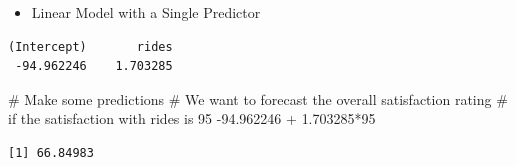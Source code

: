 \documentclass[
  ignorenonframetext,
]{beamer}
\newenvironment{Shaded}{\begin{snugshade}}{\end{snugshade}}
\newcommand{\CommentTok}[1]{\textcolor[rgb]{0.37,0.37,0.37}{#1}}
\newcommand{\DecValTok}[1]{\textcolor[rgb]{0.68,0.00,0.00}{#1}}
\newcommand{\FloatTok}[1]{\textcolor[rgb]{0.68,0.00,0.00}{#1}}
\newcommand{\NormalTok}[1]{\textcolor[rgb]{0.00,0.23,0.31}{#1}}
\newcommand{\SpecialCharTok}[1]{\textcolor[rgb]{0.37,0.37,0.37}{#1}}
\providecommand{\tightlist}{%
  \setlength{\itemsep}{0pt}\setlength{\parskip}{0pt}}\usepackage{longtable,booktabs,array}
\begin{document}
\begin{frame}[fragile]{}
\label{section-14}
\begin{itemize}
\tightlist
\item
  Linear Model with a Single Predictor
\end{itemize}

\tiny

\begin{Shaded}
\end{Shaded}

\begin{verbatim}
(Intercept)       rides 
 -94.962246    1.703285 
\end{verbatim}

\begin{Shaded}
\begin{Highlighting}[]
\CommentTok{\# Make some predictions}
\CommentTok{\# We want to forecast the overall satisfaction rating}
\CommentTok{\# if the satisfaction with rides is 95}
\SpecialCharTok{{-}}\FloatTok{94.962246} \SpecialCharTok{+} \FloatTok{1.703285}\SpecialCharTok{*}\DecValTok{95}
\end{Highlighting}
\end{Shaded}

\begin{verbatim}
[1] 66.84983
\end{verbatim}
\end{frame}
\end{document}
